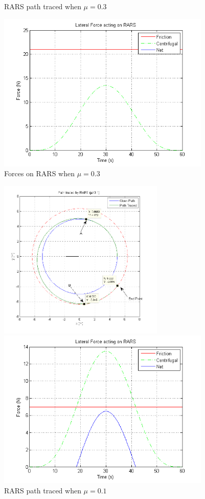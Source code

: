{\begin{figure}
\begin{minipage}[t]{0.5\textwidth}
		\caption{RARS path traced when $\mu=0.3$}\label{fig:pathWithMu3}
	\end{minipage}
	\hfill
	\begin{minipage}[t]{0.5\textwidth}
		\centering
		\includegraphics[height=3in,width=\textwidth]{Chapter4/fig/ForceMu-3}
		\caption{Forces on RARS when $\mu=0.3$ }\label{fig:ForcesMu3}
	\end{minipage}
\end{figure}
\begin{figure}
	\begin{minipage}[t]{0.5\textwidth}
		\centering
		\includegraphics[height=3in]{Chapter4/fig/PathWithMu-1slip}
		\caption{RARS path traced when $\mu=0.1$}\label{fig:pathWithMu1}
	\end{minipage}
	\hfill
	\begin{minipage}[t]{0.5\textwidth}
		\centering
		\includegraphics[height=3in,width=\textwidth]{Chapter4/fig/ForceMu-1}

\end{minipage}
\end{figure}}
